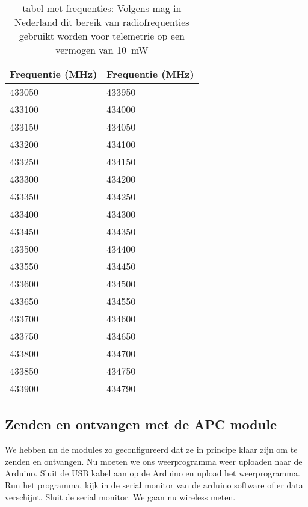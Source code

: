 \begin{center}
\begin{table}
    \begin{tabular}{ | l | l | }
    \hline
    Frequentie (MHz) & Frequentie (MHz)  \\ \hline
    433050 & 433950     \\ \hline
    433100 & 434000     \\ \hline
    433150 & 434050     \\ \hline
    433200 & 434100     \\ \hline
    433250 & 434150     \\ \hline
    433300 & 434200     \\ \hline
    433350 & 434250     \\ \hline
    433400 & 434300     \\ \hline
    433450 & 434350     \\ \hline
    433500 & 434400     \\ \hline
    433550 & 434450     \\ \hline
    433600 & 434500     \\ \hline
    433650 & 434550     \\ \hline
    433700 & 434600     \\ \hline
    433750 & 434650     \\ \hline
    433800 & 434700     \\ \hline
    433850 & 434750     \\ \hline
    433900 & 434790     \\ \hline
   \end{tabular}
   \caption{tabel met frequenties: Volgens \cite{Radio} mag in Nederland
   dit bereik van radiofrequenties gebruikt worden voor telemetrie op
   een vermogen van \SI{10}{\milli\watt}}
   \label{table:frequenties}
\end{table}
\end{center}

\subsection{Zenden en ontvangen met de APC module}

We hebben nu de modules zo geconfigureerd dat ze in principe klaar zijn
om te zenden en ontvangen. Nu moeten we ons weerprogramma weer uploaden
naar de Arduino. Sluit de USB kabel aan op de Arduino en upload het
weerprogramma. Run het programma, kijk in de serial monitor van de
arduino software of er data verschijnt. Sluit de serial monitor. We gaan
nu wireless meten.

